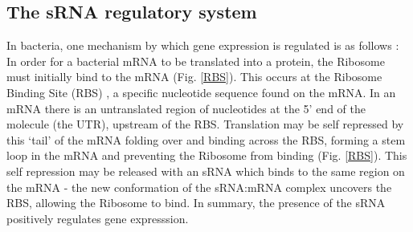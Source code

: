 \documentclass[10pt,journal]{./IEEE_latex_class/IEEEtran}
\begin{document}


\subsection{The sRNA regulatory system}
\label{The sRNA regulatory system}
In bacteria, one mechanism by which gene expression is regulated is as follows \cite{Soper2010}: In order for a bacterial mRNA to be translated into a protein, the Ribosome must initially bind to the mRNA (Fig. \ref{RBS}). This occurs at the Ribosome Binding Site (RBS) \cite{Shine1974}, a specific nucleotide sequence found on the mRNA. In an mRNA there is an untranslated region of nucleotides at the 5' end of the molecule (the UTR), upstream of the RBS. Translation may be self repressed by this `tail' of the mRNA folding over and binding across the RBS, forming a stem loop in the mRNA and preventing the Ribosome from binding (Fig. \ref{RBS}). This self repression may be released with an sRNA which binds to the same region on the mRNA - the new conformation of the sRNA:mRNA complex uncovers the RBS, allowing the Ribosome to bind. In summary, the presence of the sRNA positively regulates gene expresssion.
\end{document}
